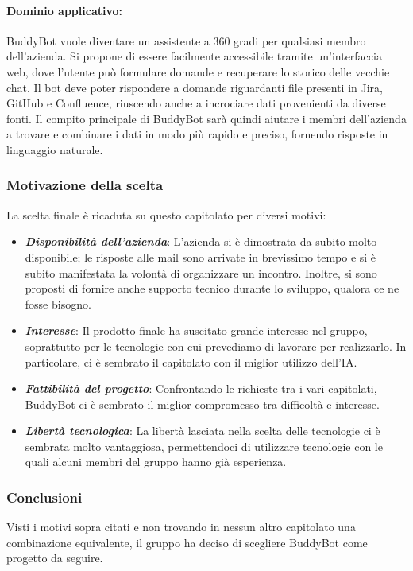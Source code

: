 \paragraph{Dominio applicativo:}
BuddyBot vuole diventare un assistente a 360 gradi per qualsiasi membro 
dell'azienda. Si propone di essere facilmente accessibile tramite
un'interfaccia web, dove l'utente può formulare domande e recuperare lo storico delle vecchie chat.
Il bot deve poter rispondere a domande riguardanti file presenti in Jira, GitHub e Confluence, 
riuscendo anche a incrociare dati provenienti da diverse fonti. Il compito principale di 
BuddyBot sarà quindi aiutare i membri dell'azienda a trovare e combinare i dati in 
modo più rapido e preciso, fornendo risposte in linguaggio naturale.

\subsubsection{Motivazione della scelta}
La scelta finale è ricaduta su questo capitolato per diversi motivi:
\begin{itemize}
    \item \textit{\textbf{Disponibilità dell'azienda}}: L'azienda si è dimostrata da subito molto disponibile; le risposte alle mail sono arrivate in brevissimo tempo e si è subito manifestata la volontà di organizzare un incontro. Inoltre, si sono proposti di fornire anche supporto tecnico durante lo sviluppo, qualora ce ne fosse bisogno.
    \item \textit{\textbf{Interesse}}: Il prodotto finale ha suscitato grande interesse nel gruppo, soprattutto per le tecnologie con cui prevediamo di lavorare per realizzarlo. In particolare, ci è sembrato il capitolato con il miglior utilizzo dell'IA.
    \item \textit{\textbf{Fattibilità del progetto}}: Confrontando le richieste tra i vari capitolati, BuddyBot ci è sembrato il miglior compromesso tra difficoltà e interesse.
    \item \textit{\textbf{Libertà tecnologica}}: La libertà lasciata nella scelta delle tecnologie ci è sembrata molto vantaggiosa, permettendoci di utilizzare tecnologie con le quali alcuni membri del gruppo hanno già esperienza.
\end{itemize}

\subsubsection{Conclusioni}
Visti i motivi sopra citati e non trovando in nessun altro capitolato una combinazione equivalente, 
il gruppo ha deciso di scegliere BuddyBot come progetto da seguire.
